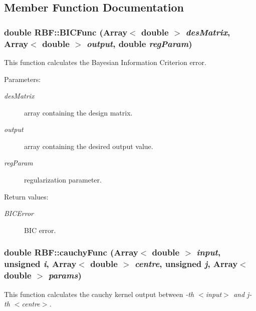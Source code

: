 \subsection{Member Function Documentation}
\subsubsection{\setlength{\rightskip}{0pt plus 5cm}double RBF::BICFunc (Array$<$ double $>$ {\em des\-Matrix}, Array$<$ double $>$ {\em output}, double {\em reg\-Param})\hspace{0.3cm}{\tt  [static]}}\label{classRBF_e11}


This function calculates the Bayesian Information Criterion error. 

\begin{Desc}
\item[Parameters:]
\begin{description}
\item[{\em des\-Matrix}]array containing the design matrix. \item[{\em output}]array containing the desired output value. \item[{\em reg\-Param}]regularization parameter. \end{description}
\end{Desc}
\begin{Desc}
\item[Return values:]
\begin{description}
\item[{\em BICError}]BIC error.\end{description}
\end{Desc}
\subsubsection{\setlength{\rightskip}{0pt plus 5cm}double RBF::cauchy\-Func (Array$<$ double $>$ {\em input}, unsigned {\em i}, Array$<$ double $>$ {\em centre}, unsigned {\em j}, Array$<$ double $>$ {\em params})\hspace{0.3cm}{\tt  [static]}}\label{classRBF_e6}


This function calculates the cauchy kernel output between {\em -th $<$input$>$ and j-th $<$centre$>$. \/}

